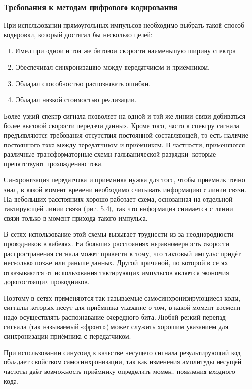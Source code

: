 \documentclass[
	a4paper,
	oneside,
	BCOR = 10mm,
	DIV = 12,
	12pt,
	headings = normal,
]{scrartcl}
\begin{document}
				\subsubsection{Требования к методам цифрового кодирования}
					При использовании прямоугольных импульсов необходимо выбрать такой способ кодировки, который достигал бы несколько целей:
					\begin{enumerate}
						\item Имел при одной и той же битовой скорости наименьшую ширину спектра.
						\item Обеспечивал синхронизацию между передатчиком и приёмником.
						\item Обладал способностью распознавать ошибки.
						\item Обладал низкой стоимостью реализации.
					\end{enumerate}

					Более узкий спектр сигнала позволяет на одной и той же линии связи добиваться более высокой скорости передачи данных. Кроме того, часто к спектру сигнала предъявляются требования отсутствия постоянной составляющей, то есть наличие постоянного тока между передатчиком и приёмником. В частности, применяются различные трансформаторные схемы гальванической разрядки, которые препятствуют прохождению тока.

					Синхронизация передатчика и приёмника нужна для того, чтобы приёмник точно знал, в какой момент времени необходимо считывать информацию с линии связи. На небольших расстояниях хорошо работает схема, основанная на отдельной тактирующей линии связи (рис. 5.4), так что информация снимается с линии связи только в момент прихода такого импульса.
					
					В сетях использование этой схемы вызывает трудности из-за неоднородности проводников в кабелях. На больших расстояниях неравномерность скорости распространения сигнала может привести к тому, что тактовый импульс придёт несколько позже или раньше данных. Другой причиной, по которой в сетях отказываются от использования тактирующих импульсов является экономия дорогостоящих проводников.

					Поэтому в сетях применяются так называемые самосинхронизирующиеся коды, сигналы которых несут для приёмника указание о том, в какой момент времени надо осуществлять распознавание очередного бита. Любой резкий перепад сигнала (так называемый «фронт») может служить хорошим указанием для синхронизации приёмника с передатчиком. 

					При использовании синусоид в качестве несущего сигнала результирующий код обладает свойством самосинхронизации, так как изменения амплитуды несущей частоты даёт возможность приёмнику определить момент появления входного кода. 
\end{document}
